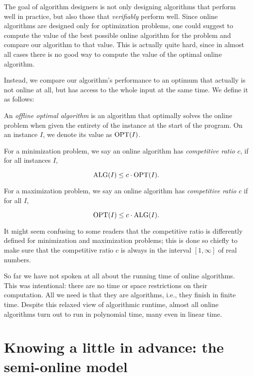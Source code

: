 The goal of algorithm designers is not only designing algorithms that
perform well in practice, but also those that \emph{verifiably}
perform well. Since online algorithms are designed only for
optimization problems, one could suggest to compute the value of the
best possible online algorithm for the problem and compare our
algorithm to that value. This is actually quite hard, since in almost
all cases there is no good way to compute the value of the optimal
online algorithm.

Instead, we compare our algorithm's performance to an optimum that
actually is not online at all, but has access to the whole input at
the same time. We define it as follows: 

\begin{dfn}\label{dfn:compratio}
An \emph{offline optimal algorithm} is an algorithm that optimally
solves the online problem when given the entirety of the instance at the start
of the program. On an instance $I$, we denote its value as $\mathrm{OPT}(I)$.

For a minimization problem, we say an online algorithm has
\emph{competitive ratio $c$}, if for all instances $I$,

\[ \mathrm{ALG}(I) \le c \cdot \mathrm{OPT}(I). \]

For a maximization problem, we say an online algorithm has
\emph{competitive ratio $c$} if for all $I$,

\[ \mathrm{OPT}(I) \le c \cdot \mathrm{ALG}(I). \]

\end{dfn}

It might seem confusing to some readers that the competitive ratio is
differently defined for minimization and maximization problems; this
is done so chiefly to make sure that the competitive ratio $c$ is
always in the interval $[1,\infty]$ of real numbers.

So far we have not spoken at all about the running time of online
algorithms. This was intentional: there are no time or space
restrictions on their computation. All we need is that they are
algorithms, i.e., they finish in finite time. Despite this relaxed
view of algorithmic runtime, almost all online algorithms turn out to
run in polynomial time, many even in linear time.


\section{Knowing a little in advance: the semi-online model}


